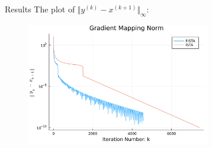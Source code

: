 \documentclass[11pt]{beamer}
\begin{document}
        \begin{frame}{Results}
            The plot of $\Vert y^{(k)} - x^{(k + 1)}\Vert_\infty$:
            \begin{figure}[h]
                \centering
                \includegraphics[width=8cm]{simple_lass_pgrad.png}
            \end{figure}
        \end{frame}
\end{document}
